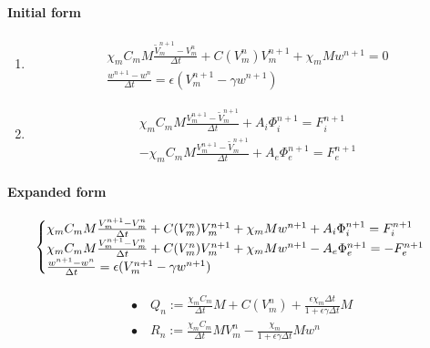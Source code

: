 \documentclass[a4paper]{article}
\begin{document}
\paragraph{Initial form}
\begin{enumerate}[label = \Roman*, align = Center]
	\item 
	\begin{equation}
	\begin{gathered}
	\chi_m C_m M \frac{\tilde{V}_m^{n+1}-V_m^n}{\Delta t} +  C(V_m^n) V_m^{n+1} + \chi_m M w^{n+1}= 0
	\\
	 \frac{w^{n+1} - w^n}{\Delta t} = \epsilon (V_m^{n+1}-\gamma w^{n+1})
	\end{gathered}
	\end{equation}
	\item 
	\begin{equation}
	\begin{gathered}
	\chi_m C_m M \frac{V_m^{n+1}-\tilde{V}_m^{n+1}}{\Delta t} + A_i \Phi_i^{n+1}= F_i^{n+1}
	\\
	- \chi_m C_m M \frac{V_m^{n+1}-\tilde{V}_m^{n+1}}{\Delta t} + A_e \Phi_e^{n+1}= F_e^{n+1}
	\end{gathered}
	\end{equation}
	
\end{enumerate}
\vspace{5mm}
\paragraph{Expanded form}
\begin{equation}
\vspace{5mm}
\begin{cases}
\chi_m C_m M \frac{V_m^{n+1}-V_m^{n}}{\Delta t} + C(V_m^n) V_m^{n+1} + \chi_m M w^{n+1} + A_i \Phi_i ^{n+1} = F_i^{n+1} \\
\chi_m C_m M \frac{V_m^{n+1}-V_m^{n}}{\Delta t} +  C(V_m^n) V_m^{n+1} + \chi_m M w^{n+1} - A_e \Phi_e ^{n+1} =  -F_e^{n+1} \\
\frac{w^{n+1}-w^{n}}{\Delta t} = \epsilon(V_m^{n+1}-\gamma w^{n+1})
\end{cases}
\end{equation}

 \begin{equation}
 \begin{gathered}
 \begin{aligned}
 & \bullet \quad Q_n := \frac{\chi_m C_m}{\Delta t}M + C(V_m^n) + \frac{\epsilon\chi_m \Delta t}{1 + \epsilon \gamma \Delta t} M \\
 & \bullet \quad R_n := \frac{\chi_mC_m}{\Delta t}MV_m^n - \frac{\chi_m}{1+\epsilon\gamma\Delta t}M w^n
 \end{aligned}
 \end{gathered}
\end{equation}
\end{document}
